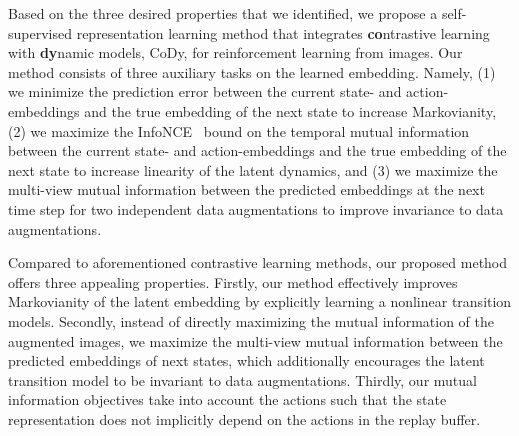 \documentclass[a4paper,12pt]{article}
\begin{document}

Based on the three desired properties that we identified, we propose a self-supervised representation learning method that integrates \textbf{co}ntrastive learning with \textbf{dy}namic models, CoDy, for reinforcement learning from images. Our method consists of three auxiliary tasks on the learned embedding. Namely, (1) we minimize the prediction error between the current state- and action-embeddings and the true embedding of the next state to increase Markovianity, (2) we maximize the InfoNCE~\cite{oord2018} bound on the temporal mutual information between the current state- and action-embeddings and the true embedding of the next state to increase linearity of the latent dynamics, and (3) we maximize the multi-view mutual information between the predicted embeddings at the next time step for two independent data augmentations to improve invariance to data augmentations.

Compared to aforementioned contrastive learning methods, our proposed method offers three appealing properties. Firstly, our method effectively improves Markovianity of the latent embedding by explicitly learning a nonlinear transition models. Secondly, instead of directly maximizing the mutual information of the augmented images, we maximize the multi-view mutual information between the predicted embeddings of next states, which additionally encourages the latent transition model to be invariant to data augmentations. Thirdly, our mutual information objectives take into account the actions such that the state representation does not implicitly depend on the actions in the replay buffer.
\end{document}

